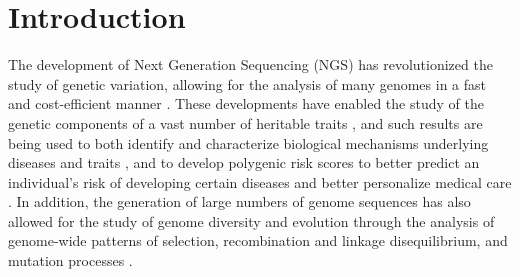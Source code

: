 \chapter{Introduction}
\label{chpt:introduction}

The development of Next Generation Sequencing (NGS) has revolutionized the study of genetic variation, allowing for the analysis of many genomes in a fast and cost-efficient manner \citep{Bagger2024}. These developments have enabled the study of the genetic components of a vast number of heritable traits \citep{Sollis2022, Szustakowski2021}, and such results are being used to both identify and characterize biological mechanisms underlying diseases and traits \citep{Gallagher2018}, and to develop polygenic risk scores to better predict an individual's risk of developing certain diseases and better personalize medical care \citep{Lewis2020}. In addition, the generation of large numbers of genome sequences has also allowed for the study of genome diversity and evolution through the analysis of genome-wide patterns of selection, recombination and linkage disequilibrium, and mutation processes \citep{Marchi2021}.

